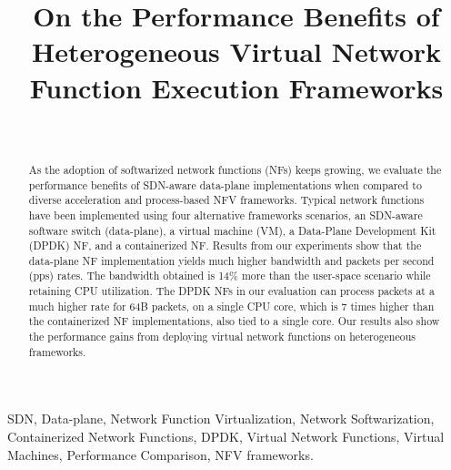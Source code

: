 \documentclass[conference]{IEEEtran}
\begin{document}
\title{On the Performance Benefits of Heterogeneous Virtual Network Function Execution Frameworks}

\author{
\and
{}
\\
\and
{}

}
\maketitle

\begin{abstract}
As the adoption of softwarized network functions (NFs) 
keeps growing, we evaluate the performance benefits of SDN-aware data-plane implementations when compared to diverse acceleration and process-based NFV frameworks. Typical network functions have been implemented using four alternative frameworks scenarios, an SDN-aware software switch (data-plane), a virtual machine (VM), a Data-Plane Development Kit (DPDK) NF, and a containerized NF. Results from our experiments show that the data-plane NF implementation yields much higher bandwidth and packets per second (pps) rates. The bandwidth obtained is 14\% more than the user-space scenario while retaining CPU utilization. The DPDK NFs in our evaluation can process packets at a much higher rate for 64B packets, on a single CPU core, which is 7 times higher than the containerized NF implementations, also tied to a single core. Our results also show the performance gains from deploying virtual network functions on heterogeneous frameworks.
\end{abstract}


\begin{IEEEkeywords}
SDN, Data-plane, Network Function Virtualization, Network Softwarization, Containerized Network Functions, DPDK, Virtual Network Functions, Virtual Machines, Performance Comparison, NFV frameworks.
\end{IEEEkeywords}
\end{document}

